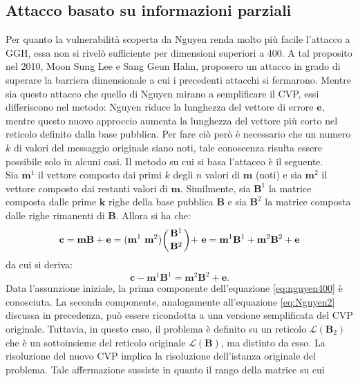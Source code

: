 \subsection{Attacco basato su informazioni parziali}
Per quanto la vulnerabilità scoperta da Nguyen renda molto più facile l'attacco a GGH, essa
non si rivelò sufficiente per dimensioni superiori a 400. A tal proposito nel 2010, Moon Sung Lee 
e Sang Geun Hahn\cite{Nguyen400}, proposero un attacco in grado di superare la barriera 
dimensionale a cui i precedenti attacchi si fermarono. Mentre sia questo attacco che quello 
di Nguyen mirano a semplificare il CVP, essi differiscono nel metodo: 
Nguyen riduce la lunghezza del vettore di errore $\mathbf{e}$, mentre questo nuovo approccio 
aumenta la lunghezza del vettore più corto nel reticolo definito dalla base pubblica.
Per fare ciò però è necessario che un numero $k$ di valori del messaggio originale siano noti,
tale conoscenza risulta essere possibile solo in alcuni casi. Il metodo su cui si basa
l'attacco è il seguente.\\
Sia $\mathbf{m}^1$ il vettore composto dai primi $k$ degli $n$ valori di $\mathbf{m}$ (noti) e
sia $\mathbf{m}^2$ il vettore composto dai restanti valori di $\mathbf{m}$. Similmente, sia 
$\mathbf{B}^1$ la matrice composta dalle prime $\mathbf{k}$ righe della base
pubblica $\mathbf{B}$ e sia $\mathbf{B}^2$ la matrice composta dalle righe rimanenti di
$\mathbf{B}$. Allora si ha che:
\begin{equation*}
    \mathbf{c} = \mathbf{m}\mathbf{B} + \mathbf{e} =
    (\mathbf{m}^1 \ \mathbf{m}^2)\biggl(\genfrac{}{}{0pt}{}{\mathbf{B}^1}{\mathbf{B}^2}\biggl) + \ \mathbf{e}
    = \mathbf{m}^1\mathbf{B}^1 + \mathbf{m}^2\mathbf{B}^2 + \mathbf{e}
\end{equation*}
da cui si deriva:
\begin{equation}
    \label{eq:nguyen400}
    \mathbf{c} - \mathbf{m}^1\mathbf{B}^1 = \mathbf{m}^2\mathbf{B}^2 + \mathbf{e}.
\end{equation}
Data l'assunzione iniziale, la prima componente dell'equazione \ref{eq:nguyen400} è conosciuta. 
La seconda componente, analogamente all'equazione \ref{eq:Nguyen2} discussa in precedenza, 
può essere ricondotta a una versione semplificata del CVP originale. 
Tuttavia, in questo caso, il problema è definito su un reticolo $\mathcal{L}(\mathbf{B}_2)$ 
che è un sottoinsieme del reticolo originale $\mathcal{L}(\mathbf{B})$, ma distinto da esso. 
La risoluzione del nuovo CVP implica la risoluzione dell'istanza 
originale del problema. Tale affermazione sussiste in quanto il rango della matrice su cui

